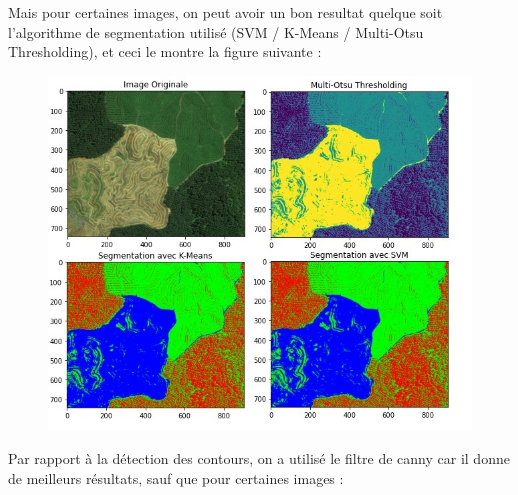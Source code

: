 \documentclass[12pt, openany]{report}
\begin{document}
Mais pour certaines images, on peut avoir un bon resultat quelque soit l'algorithme de segmentation utilisé (SVM / K-Means / Multi-Otsu Thresholding), et ceci le montre la figure suivante :

\begin{figure}[H]
\centering
\includegraphics[scale=1]{montain.jpg}
\end{figure}

Par rapport à la détection des contours, on a utilisé le filtre de canny car il donne de meilleurs résultats, sauf que pour certaines images : 
\end{document}
